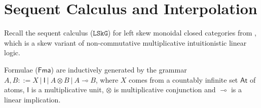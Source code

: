 \documentclass[submission,copyright,creativecommons]{eptcs}
\theoremstyle{definition}
\newcommand{\GG}{\Gamma}
\newcommand{\vd}{\vdash}
\newcommand{\ot}{\otimes}
\newcommand{\lolli}{\multimap}
\newcommand{\I}{\mathsf{I}}
\newcommand{\LSkG}{$\mathtt{LSkG}$}
\newcommand{\LSkT}{$\mathtt{LSkT}$}
\newcommand{\SkBiCT}{$\mathtt{SkBiCT}$}
\newcommand{\SkBiCA}{$\mathtt{SkBiCA}$}
\newcommand{\mf}[1]{\mathsf{#1}}
\begin{document}



\section{Sequent Calculus and Interpolation}\label{sec:syntax}
Recall the sequent calculus (\LSkG) for left skew monoidal closed categories from \cite{UVW:protsn}, which is a skew variant of non-commutative multiplicative intuitionistic linear logic.

Formulae ($\mf{Fma}$) are inductively generated by the grammar $A, B::= X \ | \ \I \ | \ A \ot B \ | \ A \lolli B$, where $X$ comes from a countably infinite set $\mathsf{At}$ of atoms, $\I$ is a multiplicative unit, $\ot$ is multiplicative conjunction and $\lolli$ is a linear implication.
\end{document}

